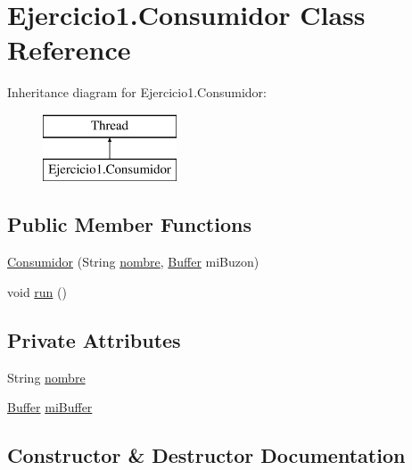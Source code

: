 \hypertarget{class_ejercicio1_1_1_consumidor}{}\section{Ejercicio1.\+Consumidor Class Reference}
\label{class_ejercicio1_1_1_consumidor}
Inheritance diagram for Ejercicio1.\+Consumidor\+:\begin{figure}[H]
\begin{center}
\leavevmode
\includegraphics[height=2.000000cm]{class_ejercicio1_1_1_consumidor}
\end{center}
\end{figure}
\subsection*{Public Member Functions}
\begin{DoxyCompactItemize}
\item 
\mbox{\hyperlink{class_ejercicio1_1_1_consumidor_a160124b1c03fe7b1b9c894bf7a2fd94a}{Consumidor}} (String \mbox{\hyperlink{class_ejercicio1_1_1_consumidor_ab75c008fd9c0c5a5e0ce3e09101ba3e4}{nombre}}, \mbox{\hyperlink{class_ejercicio1_1_1_buffer}{Buffer}} mi\+Buzon)
\item 
void \mbox{\hyperlink{class_ejercicio1_1_1_consumidor_abce2b0923447de7c4fe720301d8da71b}{run}} ()
\end{DoxyCompactItemize}
\subsection*{Private Attributes}
\begin{DoxyCompactItemize}
\item 
String \mbox{\hyperlink{class_ejercicio1_1_1_consumidor_ab75c008fd9c0c5a5e0ce3e09101ba3e4}{nombre}}
\item 
\mbox{\hyperlink{class_ejercicio1_1_1_buffer}{Buffer}} \mbox{\hyperlink{class_ejercicio1_1_1_consumidor_a1175b191e4381ba7b58a8049158791b5}{mi\+Buffer}}
\end{DoxyCompactItemize}


\subsection{Constructor \& Destructor Documentation}
\mbox{\label{class_ejercicio1_1_1_consumidor_a160124b1c03fe7b1b9c894bf7a2fd94a}} 
